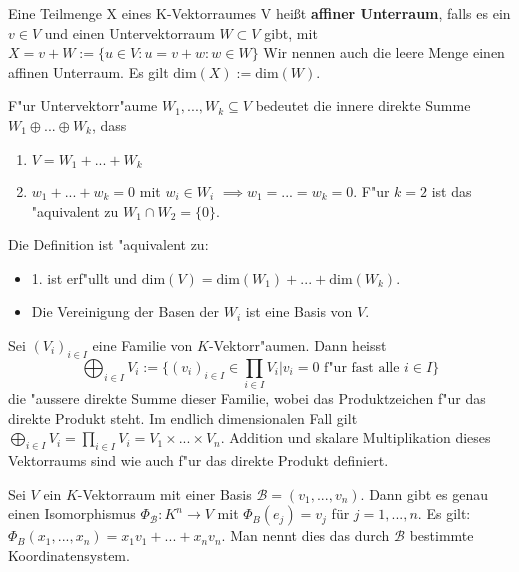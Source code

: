 \documentclass[9pt, a4paper, twocolumn, landscape]{article}
\begin{document}
\begin{definition}
Eine Teilmenge X eines K-Vektorraumes V heißt \textbf{affiner Unterraum}, falls es ein $v \in V$ und einen Untervektorraum $W \subset V$ gibt, mit
$X = v + W := \{u \in V: u = v + w: w \in W\}$ 
Wir nennen auch die leere Menge einen affinen Unterraum.
Es gilt $\mathrm{dim}(X)  := \mathrm{dim}(W)$.
\end{definition}

\begin{definition} 
F"ur Untervektorr"aume $W_1, ..., W_k \subseteq V$ bedeutet die innere direkte Summe $W_1 \oplus ... \oplus W_k$, dass 
\begin{enumerate}
\item $V = W_1 + ... + W_k$
\item $w_1 + ... + w_k = 0$ mit $w_i \in W_i$ $\implies w_1 = ... = w_k = 0$. F"ur $k = 2$ ist das "aquivalent zu $W_1 \cap W_2 = \{0\}$.
\end{enumerate}
Die Definition ist "aquivalent zu:
\begin{itemize}
\item 1. ist erf"ullt und $\mathrm{dim}(V) = \mathrm{dim}(W_1) + ... + \mathrm{dim}(W_k)$.
\item Die Vereinigung der Basen der $W_i$ ist eine Basis von $V$.
\end{itemize}
\end{definition}

\begin{definition}
Sei $(V_i)_{i \in I}$ eine Familie von $K$-Vektorr"aumen. Dann heisst 
$$
\bigoplus_{ i \in I} V_i := \{(v_i)_{i\in I} \in \prod_{i \in I} V_i | v_i = 0 \text{ f"ur fast alle } i \in I \}
$$
die "aussere direkte Summe dieser Familie, wobei das Produktzeichen f"ur das direkte Produkt steht. Im endlich dimensionalen Fall gilt $\bigoplus_{ i \in I} V_i =  \prod_{i \in I} V_i  = V_1 \times ... \times V_n$. Addition und skalare Multiplikation dieses Vektorraums sind wie auch f"ur das direkte Produkt definiert.
\end{definition}

\begin{definition}
Sei $V$ ein $K$-Vektorraum mit einer Basis $\mathcal{B} = (v_1, ..., v_n)$. Dann gibt es genau einen Isomorphismus $\Phi_\mathcal{B} : K^n \to V$ mit $ \Phi_B (e_j) = v_j $ für $j = 1, ..., n$. Es gilt:
$ \Phi_B (x_1, ..., x_n) = x_1 v_1 + ... + x_n v_n$. Man nennt dies das durch $\mathcal{B}$ bestimmte Koordinatensystem.

\end{definition}
\end{document}
